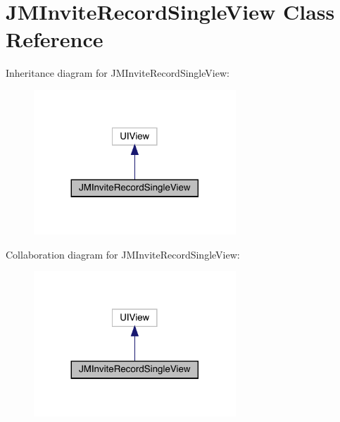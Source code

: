 \hypertarget{interface_j_m_invite_record_single_view}{}\section{J\+M\+Invite\+Record\+Single\+View Class Reference}
\label{interface_j_m_invite_record_single_view}


Inheritance diagram for J\+M\+Invite\+Record\+Single\+View\+:\nopagebreak
\begin{figure}[H]
\begin{center}
\leavevmode
\includegraphics[width=215pt]{interface_j_m_invite_record_single_view__inherit__graph}
\end{center}
\end{figure}


Collaboration diagram for J\+M\+Invite\+Record\+Single\+View\+:\nopagebreak
\begin{figure}[H]
\begin{center}
\leavevmode
\includegraphics[width=215pt]{interface_j_m_invite_record_single_view__coll__graph}
\end{center}
\end{figure}
